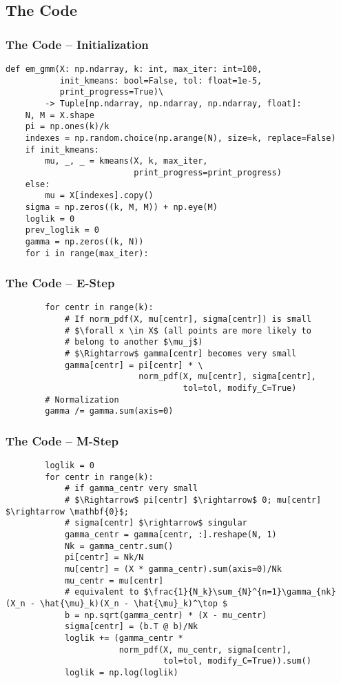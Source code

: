 \documentclass[11pt]{beamer}
\begin{document}
   \subsection{The Code}
   \begin{frame}[fragile=singleslide]
       \frametitle{The Code -- Initialization}
       \begin{verbatim}
def em_gmm(X: np.ndarray, k: int, max_iter: int=100,
           init_kmeans: bool=False, tol: float=1e-5,
           print_progress=True)\
        -> Tuple[np.ndarray, np.ndarray, np.ndarray, float]:
    N, M = X.shape
    pi = np.ones(k)/k
    indexes = np.random.choice(np.arange(N), size=k, replace=False)
    if init_kmeans:
        mu, _, _ = kmeans(X, k, max_iter,
                          print_progress=print_progress)
    else:
        mu = X[indexes].copy()
    sigma = np.zeros((k, M, M)) + np.eye(M)
    loglik = 0
    prev_loglik = 0
    gamma = np.zeros((k, N))
    for i in range(max_iter):
       \end{verbatim}
   \end{frame}
   \begin{frame}[fragile=singleslide]
       \frametitle{The Code -- E-Step}
       \begin{verbatim}
        for centr in range(k):
            # If norm_pdf(X, mu[centr], sigma[centr]) is small
            # $\forall x \in X$ (all points are more likely to 
            # belong to another $\mu_j$) 
            # $\Rightarrow$ gamma[centr] becomes very small
            gamma[centr] = pi[centr] * \
                           norm_pdf(X, mu[centr], sigma[centr],
                                    tol=tol, modify_C=True)
        # Normalization
        gamma /= gamma.sum(axis=0)
       \end{verbatim}
   \end{frame}
   \begin{frame}[fragile=singleslide]
       \frametitle{The Code -- M-Step}
       \begin{verbatim}
        loglik = 0
        for centr in range(k):
            # if gamma_centr very small
            # $\Rightarrow$ pi[centr] $\rightarrow$ 0; mu[centr] $\rightarrow \mathbf{0}$;
            # sigma[centr] $\rightarrow$ singular
            gamma_centr = gamma[centr, :].reshape(N, 1)
            Nk = gamma_centr.sum()
            pi[centr] = Nk/N
            mu[centr] = (X * gamma_centr).sum(axis=0)/Nk
            mu_centr = mu[centr]
            # equivalent to $\frac{1}{N_k}\sum_{N}^{n=1}\gamma_{nk}(X_n - \hat{\mu}_k)(X_n - \hat{\mu}_k)^\top $
            b = np.sqrt(gamma_centr) * (X - mu_centr)
            sigma[centr] = (b.T @ b)/Nk
            loglik += (gamma_centr *
                       norm_pdf(X, mu_centr, sigma[centr],
                                tol=tol, modify_C=True)).sum()
            loglik = np.log(loglik)
       \end{verbatim}
   \end{frame}
\end{document}
